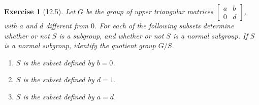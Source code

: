 \documentclass[12pt]{article}
\newtheorem*{exer}{Exercise}
\begin{document}
\begin{exer}[12.5]
Let $G$ be the group of upper triangular matrices $\left
[\begin{array}{cc} a & b  \\ 0 & d \end{array} \right ]$, with $a$ and
$d$ different from $0$. For each of the following subsets determine
whether or not $S$ is a subgroup, and whether or not $S$ is a normal
subgroup. If $S$ is a normal subgroup, identify the quotient group
$G/S$.
\begin{enumerate}
\item $S$ is the subset defined by $b=0$.
\item $S$ is the subset defined by $d=1$.
\item $S$ is the subset defined by $a=d$.
\end{enumerate}
\end{exer}
\end{document}
